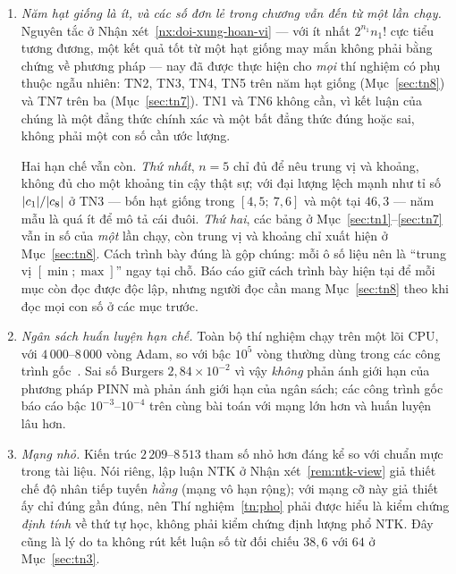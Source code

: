 \begin{enumerate}[label=(\arabic*),leftmargin=2.2em,itemsep=4pt]
\item \emph{Năm hạt giống là ít, và các số đơn lẻ trong chương vẫn đến từ một
lần chạy.} Nguyên tắc ở Nhận xét~\ref{nx:doi-xung-hoan-vi} --- với ít nhất
$2^{n_1}n_1!$ cực tiểu tương đương, một kết quả tốt từ một hạt giống may mắn
không phải bằng chứng về phương pháp --- nay đã được thực hiện cho \emph{mọi}
thí nghiệm có phụ thuộc ngẫu nhiên: TN2, TN3, TN4, TN5 trên năm hạt giống
(Mục~\ref{sec:tn8}) và TN7 trên ba (Mục~\ref{sec:tn7}). TN1 và TN6 không cần,
vì kết luận của chúng là một đẳng thức chính xác và một bất đẳng thức đúng hoặc
sai, không phải một con số cần ước lượng.

Hai hạn chế vẫn còn. \emph{Thứ nhất}, $n = 5$ chỉ đủ để nêu trung vị và khoảng,
không đủ cho một khoảng tin cậy thật sự; với đại lượng lệch mạnh như tỉ số
$\lvert c_1\rvert/\lvert c_8\rvert$ ở TN3 --- bốn hạt giống trong $[4{,}5;\ 7{,}6]$ và một tại
$46{,}3$ --- năm mẫu là quá ít để mô tả cái đuôi. \emph{Thứ hai}, các bảng ở
Mục~\ref{sec:tn1}--\ref{sec:tn7} vẫn in số của \emph{một} lần chạy, còn trung
vị và khoảng chỉ xuất hiện ở Mục~\ref{sec:tn8}. Cách trình bày đúng là gộp
chúng: mỗi ô số liệu nên là ``trung vị $[\min;\max]$'' ngay tại chỗ. Báo cáo
giữ cách trình bày hiện tại để mỗi mục còn đọc được độc lập, nhưng người đọc cần
mang Mục~\ref{sec:tn8} theo khi đọc mọi con số ở các mục trước.
 
\item \emph{Ngân sách huấn luyện hạn chế.} Toàn bộ thí nghiệm chạy trên một lõi
CPU, với $4\,000$--$8\,000$ vòng Adam, so với bậc $10^5$ vòng thường dùng trong
các công trình gốc~\cite{raissi2019}. Sai số Burgers $2{,}84\times10^{-2}$ vì vậy
\emph{không} phản ánh giới hạn của phương pháp PINN mà phản ánh giới hạn của ngân
sách; các công trình gốc báo cáo bậc $10^{-3}$--$10^{-4}$ trên cùng bài toán với
mạng lớn hơn và huấn luyện lâu hơn.
 
\item \emph{Mạng nhỏ.} Kiến trúc $2\,209$--$8\,513$ tham số nhỏ hơn đáng kể so với
chuẩn mực trong tài liệu. Nói riêng, lập luận NTK ở Nhận xét~\ref{rem:ntk-view}
giả thiết chế độ nhân tiếp tuyến \emph{hằng} (mạng vô hạn rộng); với mạng cỡ này
giả thiết ấy chỉ đúng gần đúng, nên Thí nghiệm~\ref{tn:pho} phải được hiểu là kiểm
chứng \emph{định tính} về thứ tự học, không phải kiểm chứng định lượng phổ NTK.
Đây cũng là lý do ta không rút kết luận số từ đối chiếu $38{,}6$ với $64$ ở
Mục~\ref{sec:tn3}.
 

\end{enumerate}
